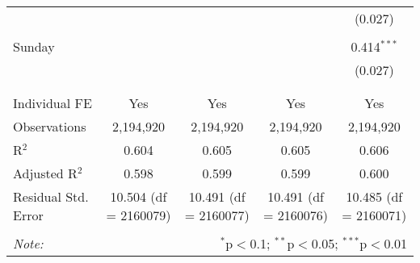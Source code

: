 \documentclass[
]{article}
\begin{document}
\begin{table}[!htbp]
{\begin{tabular}{@{\extracolsep{5pt}}lcccc}
  &  &  &  & (0.027) \\ 
  & & & & \\ 
 Sunday &  &  &  & 0.414$^{***}$ \\ 
  &  &  &  & (0.027) \\ 
  & & & & \\ 
\hline \\[-1.8ex] 
Individual FE & Yes & Yes & Yes & Yes \\ 
Observations & 2,194,920 & 2,194,920 & 2,194,920 & 2,194,920 \\ 
R$^{2}$ & 0.604 & 0.605 & 0.605 & 0.606 \\ 
Adjusted R$^{2}$ & 0.598 & 0.599 & 0.599 & 0.600 \\ 
Residual Std. Error & 10.504 (df = 2160079) & 10.491 (df = 2160077) & 10.491 (df = 2160076) & 10.485 (df = 2160071) \\ 
\hline 
\hline \\[-1.8ex] 
\textit{Note:}  & \multicolumn{4}{r}{$^{*}$p$<$0.1; $^{**}$p$<$0.05; $^{***}$p$<$0.01} \\ 
\end{tabular}
} 
\end{table} 
\newpage
\end{document}
